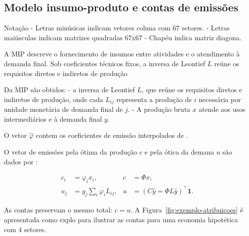 \subsection{Modelo insumo-produto e contas de emissões}
\label{sec:derivacao}
\label{sec:atribuicoes}

Notação
- Letras minúsicas indicam vetores coluna com 67 setores. 
- Letras maiúsculas indicam matrizes quadradas 67x67
- Chapéu indica matriz diagona. 

A MIP descreve o fornecimento de insumos entre atividades e o atendimento à demanda final. Sob coeficientes técnicos fixos, a inversa de Leontief $L$ reúne os requisitos diretos e indiretos de produção \parencite{millerBlair2009}

Da MIP são obtidos:
- a inversa de Leontief $L$, que reúne os requisitos diretos e indiretos de produção, onde cada $L_{ij}$ representa a produção de $i$ necessária por unidade monetária de demanda final de $j$.
- A produção bruta $x$ atende aos usos intermediários e à demanda final $y$.

O vetor $\widehat \varphi$ contem os coeficientes de emissão interpolados de \textcite{sanguinetAzzoni2024}.

O vetor de emissões pela ótima da produção $c$ e pela ótica da demana $u$ são dados por \parencite{marques2012}:

\begin{align}
c_i&=\varphi_i x_i, & c&=\Phi x,
\label{eq:conta-producao}
\\
u_j&=y_j\sum_i\varphi_iL_{ij}, & u&=(C\widehat y=\Phi L\widehat y)^\top\mathbf{1}.
\label{eq:conta-demanda}
\end{align}

As contas preservam o mesmo total: $c=u$. A Figura~\ref{fig:exemplo-atribuicoes} é apresentada como explo para ilustrar as contas para uma economia hipotética com 4 setores. 

